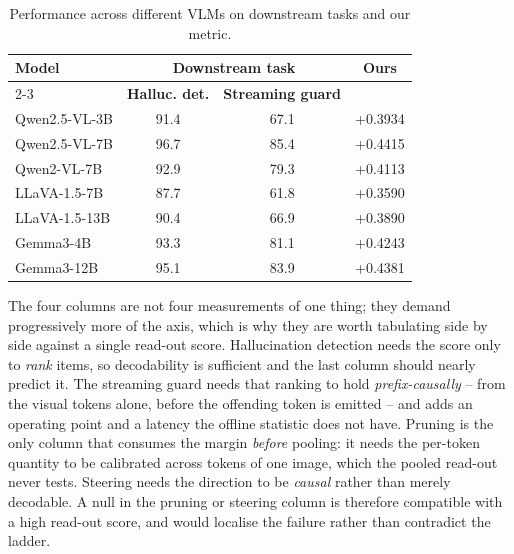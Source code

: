 \begin{table}[t]
\centering
\caption{Performance across different VLMs on downstream tasks and our metric.}
\label{tab:downstream-correlation}
\begin{tabular}{lccc}
\toprule
\multirow{2}{*}{\textbf{Model}}
& \multicolumn{2}{c}{\textbf{Downstream task}}
& \multirow{2}{*}{\textbf{Ours}} \\
\cmidrule(lr){2-3}
& \textbf{Halluc. det.}
& \textbf{Streaming guard}
& \\
\midrule
Qwen2.5-VL-3B  & 91.4 & 67.1 & +0.3934 \\
Qwen2.5-VL-7B  & 96.7 & 85.4 & +0.4415 \\
Qwen2-VL-7B    & 92.9 & 79.3 & +0.4113 \\
LLaVA-1.5-7B   & 87.7 & 61.8 & +0.3590 \\
LLaVA-1.5-13B  & 90.4 & 66.9 & +0.3890 \\
Gemma3-4B      & 93.3 & 81.1 & +0.4243 \\
Gemma3-12B     & 95.1 & 83.9 & +0.4381 \\
\bottomrule
\end{tabular}
\end{table}The four columns are not four measurements of one thing; they demand
progressively more of the axis, which is why they are worth tabulating side by
side against a single read-out score. Hallucination detection needs the score
only to \emph{rank} items, so decodability is sufficient and the last column
should nearly predict it. The streaming guard needs that ranking to hold
\emph{prefix-causally} -- from the visual tokens alone, before the offending
token is emitted -- and adds an operating point and a latency the offline
statistic does not have. Pruning is the only column that consumes the margin
\emph{before} pooling: it needs the per-token quantity to be calibrated across
tokens of one image, which the pooled read-out never tests. Steering needs the
direction to be \emph{causal} rather than merely decodable. A null in the
pruning or steering column is therefore compatible with a high read-out score,
and would localise the failure rather than contradict the ladder.

